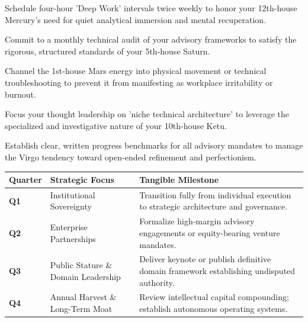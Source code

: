 \begin{diamondlist}
  \item {\fontsize{8.5}{12}\selectfont Schedule four-hour 'Deep Work' intervals twice weekly to honor your 12th-house Mercury's need for quiet analytical immersion and mental recuperation.}
  \item {\fontsize{8.5}{12}\selectfont Commit to a monthly technical audit of your advisory frameworks to satisfy the rigorous, structured standards of your 5th-house Saturn.}
  \item {\fontsize{8.5}{12}\selectfont Channel the 1st-house Mars energy into physical movement or technical troubleshooting to prevent it from manifesting as workplace irritability or burnout.}
  \item {\fontsize{8.5}{12}\selectfont Focus your thought leadership on 'niche technical architecture' to leverage the specialized and investigative nature of your 10th-house Ketu.}
  \item {\fontsize{8.5}{12}\selectfont Establish clear, written progress benchmarks for all advisory mandates to manage the Virgo tendency toward open-ended refinement and perfectionism.}
\end{diamondlist}


\begin{highlightcard}
  \sffamily\fontsize{8}{11.5}\selectfont
  \begin{tabularx}{\linewidth}{@{}l l X@{}}
    \toprule
    \textbf{Quarter} & \textbf{Strategic Focus} & \textbf{Tangible Milestone} \\
    \midrule
    \textbf{Q1} & Institutional Sovereignty & Transition fully from individual execution to strategic architecture and governance. \\
    \textbf{Q2} & Enterprise Partnerships & Formalize high-margin advisory engagements or equity-bearing venture mandates. \\
    \textbf{Q3} & Public Stature \& Domain Leadership & Deliver keynote or publish definitive domain framework establishing undisputed authority. \\
    \textbf{Q4} & Annual Harvest \& Long-Term Moat & Review intellectual capital compounding; establish autonomous operating systems. \\
    \bottomrule
  \end{tabularx}
\end{highlightcard}\vspace{2mm}

